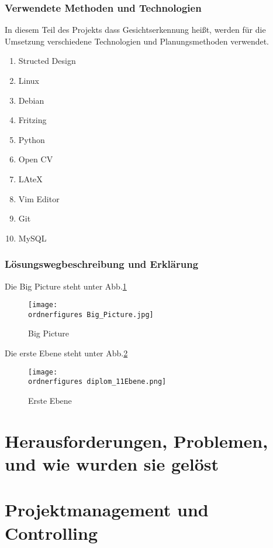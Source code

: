 		\subsubsection{Verwendete Methoden und Technologien}
In diesem Teil des Projekts dass Gesichtserkennung heißt, werden für die Umsetzung verschiedene Technologien und Planungsmethoden verwendet.
\begin{enumerate}
	\item Structed Design
	\item Linux
	\item Debian
	\item Fritzing
	\item Python
	\item Open CV
	\item LAteX
	\item Vim Editor
	\item Git
	\item MySQL
\end{enumerate}
		\subsubsection{Lösungswegbeschreibung und Erklärung}
		Die Big Picture steht unter Abb.\ref{fig:Big Picture}
		\begin{figure}[htp]
			\texttt{[image: \\ordnerfigures Big\_Picture.jpg]}
			\caption{Big Picture}
			\label{fig:Big Picture}
		\end{figure}
	
	
	Die erste Ebene steht unter Abb.\ref{fig:Erste Ebene}
	\begin{figure}[htp]
		\texttt{[image: \\ordnerfigures diplom\_11Ebene.png]}
		\caption{Erste Ebene}
		\label{fig:Erste Ebene}
	\end{figure}
\section{Herausforderungen, Problemen, und wie wurden sie gelöst}
\section{Projektmanagement und Controlling}
		



